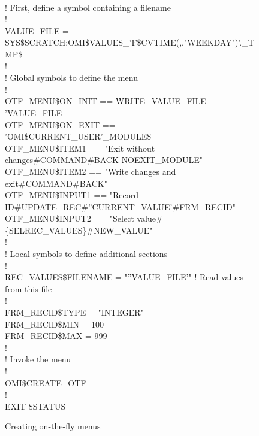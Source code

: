 \documentclass[a4paper]{book}
\renewcommand{\indent}{\hspace*{5mm}}
\begin{document}
\begin{figure}[h!tb]
\begin{minipage}[h!tb]{\textwidth}
\hrulefill \\
\begin{small}
\begin{ttfamily}
\indent{\$}! First, define a symbol containing a filename \\
\indent{\$}! \\
\indent{\$} VALUE{\_}FILE = SYS{\$}SCRATCH:OMI{\$}VALUES{\_}'F{\$}CVTIME(,,"WEEKDAY")'.{\_}TMP{\$} \\
\indent{\$}! \\
\indent{\$}! Global symbols to define the menu \\
\indent{\$}! \\
\indent{\$} OTF{\_}MENU{\$}ON{\_}INIT == WRITE{\_}VALUE{\_}FILE 'VALUE{\_}FILE \\
\indent{\$} OTF{\_}MENU{\$}ON{\_}EXIT == 'OMI{\$}CURRENT{\_}USER'{\_}MODULE{\$} \\
\indent{\$} OTF{\_}MENU{\$}ITEM1 == "Exit without changes{\#}COMMAND{\#}BACK NOEXIT{\_}MODULE" \\
\indent{\$} OTF{\_}MENU{\$}ITEM2 == "Write changes and exit{\#}COMMAND{\#}BACK" \\
\indent{\$} OTF{\_}MENU{\$}INPUT1 == "Record ID{\#}UPDATE{\_}REC{\#}''CURRENT{\_}VALUE'{\#}FRM{\_}RECID"  \\
\indent{\$} OTF{\_}MENU{\$}INPUT2 == "Select value{\#}{\{}SEL\textbar REC{\_}VALUES{\}}{\#}NEW{\_}VALUE" \\
\indent{\$}! \\
\indent{\$}! Local symbols to define additional sections \\
\indent{\$}! \\
\indent{\$} REC{\_}VALUES{\$}FILENAME = "''VALUE{\_}FILE'" ! Read values from this file \\
\indent{\$}! \\
\indent{\$} FRM{\_}RECID{\$}TYPE = "INTEGER" \\
\indent{\$} FRM{\_}RECID{\$}MIN = 100 \\
\indent{\$} FRM{\_}RECID{\$}MAX = 999 \\
\indent{\$}! \\
\indent{\$}! Invoke the menu \\
\indent{\$}! \\
\indent{\$} OMI{\$}CREATE{\_}OTF \\
\indent{\$}! \\
\indent{\$} EXIT {\$}STATUS \\
\end{ttfamily}
\end{small}
\caption{Creating on-the-fly menus}\label{fig:otfcre}
\hrulefill
\end{minipage}
\end{figure}
\end{document}
